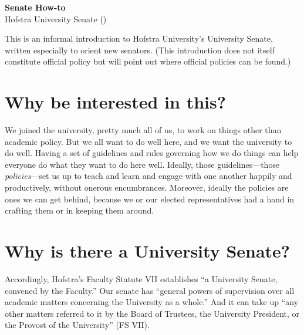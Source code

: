 \documentclass[12pt]{article}
\begin{document}
\thispagestyle{empty}



\begin{center}
  \textbf{\large Senate How-to} \\ Hofstra University Senate (\the\year) 
\end{center}



\noindent This is an informal introduction to Hofstra University's University
Senate, written especially to orient new senators. (This introduction
does not itself constitute official policy but will point out where
official policies can be found.)



\begin{center}
\begin{minipage}[c]{4.25in} %
\tableofcontents
\end{minipage}
\end{center}



\section{Why be interested in this?}\label{why-be-interested-in-this}

We joined the university, pretty much all of us, to work on things other
than academic policy. But we all want to do well here, and we want the
university to do well. Having a set of guidelines and rules governing
how we do things can help everyone do what they want to do here well.
Ideally, those guidelines---those \emph{policies}---set us up to teach
and learn and engage with one another happily and productively, without
onerous encumbrances. Moreover, ideally the policies are ones we can get
behind, because we or our elected representatives had a hand in crafting
them or in keeping them around.

\section{Why is there a University
Senate?}\label{why-is-there-a-university-senate}

Accordingly, Hofstra's Faculty Statute VII establishes ``a University
Senate, convened by the Faculty.'' Our senate has ``general powers of
supervision over all academic matters concerning the University as a
whole.'' And it can take up ``any other matters referred to it by the
Board of Trustees, the University President, or the Provost of the
University'' (FS VII).
\end{document}

